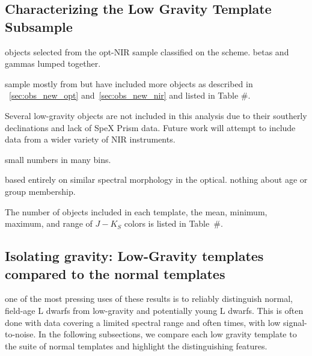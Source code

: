 \documentclass[12pt,preprint]{aastex}
\begin{document}
\subsection{Characterizing the Low Gravity Template Subsample}
\label{sec:templates_lowg}

objects selected from the opt-NIR sample classified on the \citet{Cruz09_lowg} scheme. betas and gammas lumped together.

sample mostly from \citet{Cruz09_lowg} but have included more objects as described in \SS~\ref{sec:obs_new_opt} and~\ref{sec:obs_new_nir} and listed in Table \#.

Several low-gravity objects are not included in this analysis due to their southerly declinations and lack of SpeX Prism data. Future work will attempt to include data from a wider variety of NIR instruments.

small numbers in many bins.

based entirely on similar spectral morphology in the optical. nothing about age or group membership.

The number of objects included in each template, the mean, minimum, maximum, and range of $J-K_S$ colors is listed in Table~\#. 

\subsection{Isolating gravity: Low-Gravity templates compared to the normal templates} 

one of the most pressing uses of these results is to reliably distinguish normal, field-age L dwarfs from low-gravity and potentially young L dwarfs. This is often done with data covering a limited spectral range and often times, with low signal-to-noise. In the following subsections, we compare each low gravity template to the suite of normal templates and highlight the distinguishing features.
\end{document}
